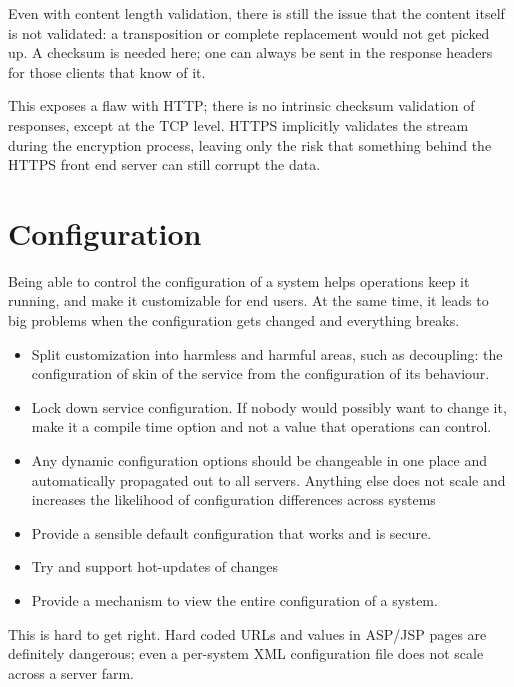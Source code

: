 \documentclass[draft]{report}
\begin{document}
Even with content length validation, there is still the issue that the
content itself is not validated: a transposition or complete replacement
would not get picked up. A checksum is needed here; one can always be
sent in the response headers for those clients that know of it.

This exposes a flaw with HTTP; there is no intrinsic checksum validation
of responses, except at the TCP level. HTTPS implicitly validates the
stream during the encryption process, leaving only the risk that
something behind the HTTPS front end server can still corrupt the data.

\section{Configuration}

Being able to control the configuration of a system helps operations
keep it running, and make it customizable for end users. At the same
time, it leads to big problems when the configuration gets changed and
everything breaks.

\begin{itemize}

\item Split customization into harmless and harmful areas, such as
decoupling: the configuration of skin of the service from the
configuration of its behaviour.

\item Lock down service configuration. If nobody would possibly want to
change it, make it a compile time option and not a value that operations
can control.

\item Any dynamic configuration options should be changeable in one
place and automatically propagated out to all servers. Anything else
does not scale and increases the likelihood of configuration differences
across systems

\item Provide a sensible default configuration that works and is secure.


\item Try and support hot-updates of changes

\item Provide a mechanism to view the entire configuration of a system.

\end{itemize}

This is hard to get right. Hard coded URLs and values in ASP/JSP pages
are definitely dangerous; even a per-system XML configuration file does
not scale across a server farm.
\end{document}
